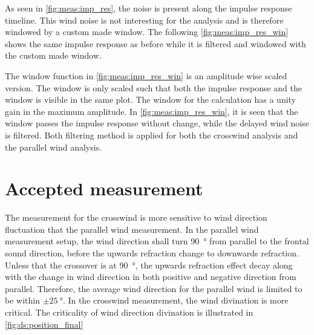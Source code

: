 

As seen in \autoref{fig:meas:imp_res}, the noise is present along the impulse response timeline. This wind noise is not interesting for the analysis and is therefore windowed by a custom made window. The following \autoref{fig:meas:imp_res_win} shows the same impulse response as before while it is filtered and windowed with the custom made window.



The window function in \autoref{fig:meas:imp_res_win} is an amplitude wise scaled version. The window is only scaled such that both the impulse response and the window is visible in the same plot. The window for the calculation has a unity gain in the maximum amplitude. In \autoref{fig:meas:imp_res_win}, it is seen that the window passes the impulse response without change, while the delayed wind noise is filtered. Both filtering method is applied for both the crosswind analysis and the parallel wind analysis. 

\section{Accepted measurement}
The measurement for the crosswind is more sensitive to wind direction fluctuation that the parallel wind measurement. In the parallel wind measurement setup, the wind direction shall turn \SI{90}{\degree} from parallel to the frontal sound direction, before the upwards refraction change to downwards refraction. Unless that the crossover is at \SI{90}{\degree}, the upwards refraction effect decay along with the change in wind direction in both positive and negative direction from parallel. Therefore, the average wind direction for the parallel wind is limited to be within $\pm\SI{25}{\degree}$. In the crosswind measurement, the wind divination is more critical. The criticality of wind direction divination is illustrated in \autoref{fig:ds:position_final}


